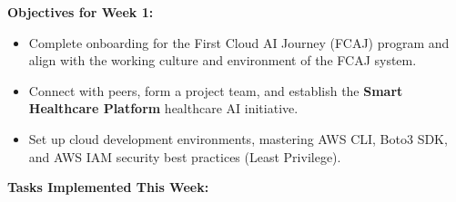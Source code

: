 \vspace{0.5em}\noindent\textbf{Objectives for Week 1:}

\begin{itemize}
\tightlist
\item
  Complete onboarding for the First Cloud AI Journey (FCAJ) program and
  align with the working culture and environment of the FCAJ system.
\item
  Connect with peers, form a project team, and establish the
  \textbf{Smart Healthcare Platform} healthcare AI initiative.
\item
  Set up cloud development environments, mastering AWS CLI, Boto3 SDK,
  and AWS IAM security best practices (Least Privilege).
\end{itemize}

\vspace{0.5em}\noindent\textbf{Tasks Implemented This Week:}

